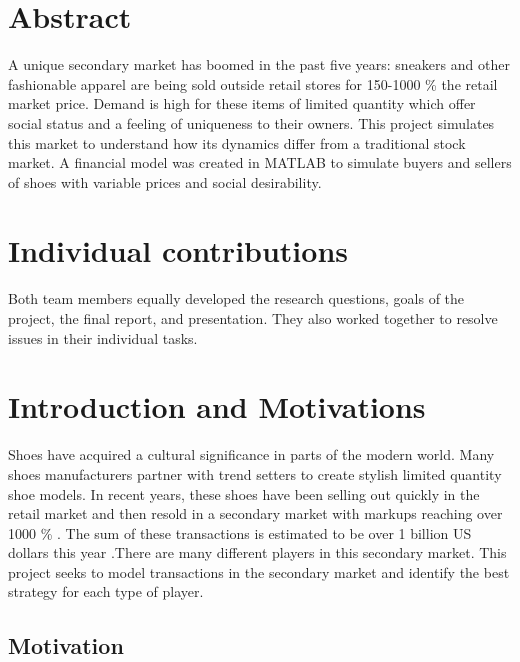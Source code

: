 \documentclass[12pt]{article}
\begin{document}



\section{Abstract}

A unique secondary market has boomed in the past five years: sneakers and other fashionable apparel are being sold outside retail stores for 150-1000 \% the retail market price. Demand is high for these items of limited quantity which offer social status and a feeling of uniqueness to their owners. This project simulates this market to understand how its dynamics differ from a traditional stock market. A financial model was created in MATLAB to simulate buyers and sellers of shoes with variable prices and social desirability. 


\section{Individual contributions}

Both team members equally developed the research questions, goals of the project, the final report, and presentation. They also worked together to resolve issues in their individual tasks. %


\newpage
\section{Introduction and Motivations}

Shoes have acquired a cultural significance in parts of the modern world. Many shoes manufacturers partner with trend setters to create stylish limited quantity shoe models. In recent years, these shoes have been selling out quickly in the retail market and then resold in a secondary market with markups reaching over 1000 \% \cite{538}. The sum of these transactions is estimated to be over 1 billion US dollars this year \cite{Forbes}.There are many different players in this secondary market. This project seeks to model transactions in the secondary market and identify the best strategy for each type of player.
\subsection{Motivation}
\end{document}
